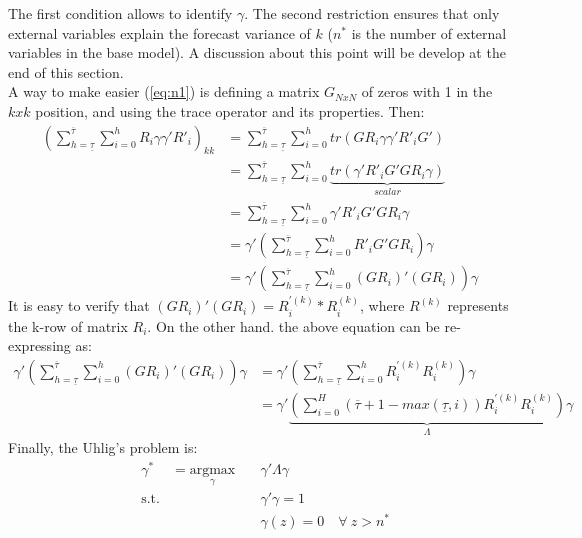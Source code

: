 \documentclass[12pt, a4paper]{article}
\begin{document}
The first condition allows to identify $\gamma$. The second restriction ensures that only external variables explain the forecast variance of $k$ ($n^*$ is the number of external variables in the base model). A discussion about this point will be develop at the end of this section. \\
A way to make easier (\ref{eq:n1}) is defining a matrix $G_{NxN}$ of zeros with 1 in the $kxk$ position, and using the trace operator and its properties. Then:
\begin{equation*}
\begin{aligned}
\left(\sum_{h = \underline{\tau}}^{\overline{\tau}}\sum_{i=0}^h R_{i}\gamma \gamma' R'_{i} \right)_{kk} & = \sum_{h = \underline{\tau}}^{\overline{\tau}}\sum_{i=0}^h tr(G R_{i}\gamma \gamma' R'_{i} G') \\
& = \sum_{h = \underline{\tau}}^{\overline{\tau}}\sum_{i=0}^h \underbrace{tr(\gamma' R'_{i} G'G R_{i}\gamma )}_{scalar} \\
& = \sum_{h = \underline{\tau}}^{\overline{\tau}}\sum_{i=0}^h \gamma' R'_{i} G'G R_{i}\gamma \\
& = \gamma' \left( \sum_{h =\underline{\tau}}^{\overline{\tau}}\sum_{i=0}^h  R'_{i} G'G R_{i} \right) \gamma \\
& = \gamma' \left( \sum_{h =\underline{\tau}}^{\overline{\tau}}\sum_{i=0}^h  (G R_{i})'(G R_{i}) \right) \gamma
\end{aligned}
\end{equation*}
It is easy to verify that $(G R_{i})'(G R_{i}) = R^{'(k)}_i*R^{(k)}_i$, where $R^{(k)}$ represents the k-row of matrix $R_i$. On the other hand. the above equation can be re-expressing as:
\begin{equation*}
\begin{aligned}
\gamma' \left( \sum_{h =\underline{\tau}}^{\overline{\tau}}\sum_{i=0}^h  (G R_{i})'(G R_{i}) \right) \gamma &= \gamma' \left( \sum_{h =\underline{\tau}}^{\overline{\tau}}\sum_{i=0}^h  R^{'(k)}_i R^{(k)}_i \right) \gamma \\
&= \gamma' \underbrace{\left(\sum_{i=0}^H (\overline{\tau}+1-max(\underline{\tau},i)) R^{'(k)}_iR^{(k)}_i \right)}_{\Lambda} \gamma
\end{aligned}
\end{equation*}
Finally, the Uhlig's problem is:
\begin{equation*}
\begin{aligned}
& \gamma^* &= \underset{\gamma}{\text{argmax}}  \quad
& \gamma' \Lambda  \gamma \\
& \text{s.t.}
&  & \gamma' \gamma = 1 \\
&  & & \gamma(z)  = 0 \quad \forall \ z>n^*
\end{aligned}
\end{equation*}
\end{document}
